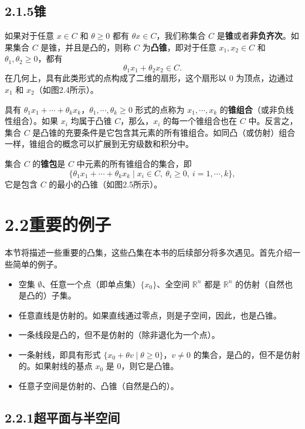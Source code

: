 \documentclass[UTF8,12pt,a4paper,fontset=fandol]{ctexart}
\begin{document}
\subsection*{2.1.5\quad 锥}

如果对于任意 $x\in C$ 和 $\theta\ge 0$ 都有 $\theta x\in C$，我们称集合 $C$ 是\textbf{锥}或者\textbf{非负齐次}。如果集合 $C$ 是锥，并且是凸的，则称 $C$ 为\textbf{凸锥}，即对于任意 $x_1,x_2\in C$ 和 $\theta_1,\theta_2\ge 0$，都有
\[
  \theta_1x_1+\theta_2x_2\in C.
\]
在几何上，具有此类形式的点构成了二维的扇形，这个扇形以 0 为顶点，边通过 $x_1$ 和 $x_2$（如图2.4所示）。

具有 $\theta_1x_1+\cdots+\theta_kx_k$，$\theta_1,\cdots,\theta_k\ge 0$ 形式的点称为 $x_1,\cdots,x_k$ 的\textbf{锥组合}（或非负线性组合）。如果 $x_i$ 均属于凸锥 $C$，那么，$x_i$ 的每一个锥组合也在 $C$ 中。反言之，集合 $C$ 是凸锥的充要条件是它包含其元素的所有锥组合。如同凸（或仿射）组合一样，锥组合的概念可以扩展到无穷级数和积分中。

集合 $C$ 的\textbf{锥包}是 $C$ 中元素的所有锥组合的集合，即
\[
  \{\theta_1x_1+\cdots+\theta_kx_k\mid x_i\in C,\ \theta_i\ge 0,\ i=1,\cdots,k\},
\]
它是包含 $C$ 的最小的凸锥（如图2.5所示）。

\section*{2.2\quad 重要的例子}

本节将描述一些重要的凸集，这些凸集在本书的后续部分将多次遇见。首先介绍一些简单的例子。

\begin{itemize}
  \item 空集 $\emptyset$、任意一个点（即单点集）$\{x_0\}$、全空间 $\mathbb{R}^n$ 都是 $\mathbb{R}^n$ 的仿射（自然也是凸的）子集。
  \item 任意直线是仿射的。如果直线通过零点，则是子空间，因此，也是凸锥。
  \item 一条线段是凸的，但不是仿射的（除非退化为一个点）。
  \item 一条射线，即具有形式 $\{x_0+\theta v\mid \theta\ge 0\}$，$v\ne 0$ 的集合，是凸的，但不是仿射的。如果射线的基点 $x_0$ 是 0，则它是凸锥。
  \item 任意子空间是仿射的、凸锥（自然是凸的）。
\end{itemize}

\subsection*{2.2.1\quad 超平面与半空间}
\end{document}
